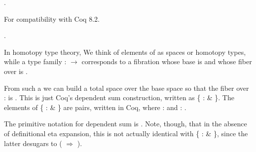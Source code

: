 \documentclass[12pt]{report}
\begin{document}
\begin{coqdoccode}
\coqdocnoindent
{}  .\coqdoceol
\coqdocemptyline
\end{coqdoccode}
For compatibility with Coq 8.2. \begin{coqdoccode}
\coqdocnoindent
{}  .\coqdoceol
\coqdocemptyline
\end{coqdoccode}
In homotopy type theory, We think of elements of  as spaces
   or homotopy types, while a type family  :  \ensuremath{\rightarrow}  corresponds
   to a fibration whose base is  and whose fiber over  is  .


   From such a  we can build a total space over the base space 
   so that the fiber over  :  is  .  This is just Coq's
   dependent sum construction, written as \{ :  \&  \}.  The
   elements of \{ :  \&  \} are pairs, written     in
   Coq, where  :  and  :  .


   The primitive notation for dependent sum is  .  Note,
   though, that in the absence of definitional eta expansion, this is
   not actually identical with \{ :  \&  \}, since the latter
   desugars to  (  \ensuremath{\Rightarrow}  ).
\end{document}
